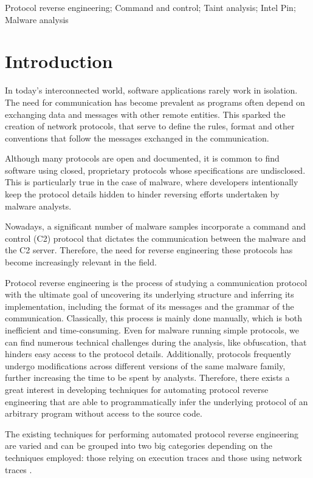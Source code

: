 \documentclass[conference]{IEEEtran}
\begin{document}
\begin{IEEEkeywords}
    Protocol reverse engineering; Command and control; Taint analysis; Intel Pin; Malware analysis 
\end{IEEEkeywords}

\section{Introduction}
In today's interconnected world, software applications rarely work in
isolation. The need for communication has become prevalent as programs often
depend on exchanging data and messages with other remote entities. This sparked
the creation of network protocols, that serve to define the rules, format and
other conventions that follow the messages exchanged in the communication.

Although many protocols are open and documented, it is common to find software
using closed, proprietary protocols whose specifications are undisclosed. This
is particularly true in the case of malware, where developers intentionally
keep the protocol details hidden to hinder reversing efforts undertaken by
malware analysts.

Nowadays, a significant number of malware samples incorporate a command and
control (C2) protocol that dictates the communication between the malware and
the C2 server. Therefore, the need for reverse engineering these protocols has
become increasingly relevant in the field.

Protocol reverse engineering is the process of studying a communication
protocol with the ultimate goal of uncovering its underlying structure and
inferring its implementation, including the format of its messages and the
grammar of the communication. Classically, this process is mainly done
manually, which is both inefficient and time-consuming. Even for malware running
simple protocols, we can find numerous technical challenges during the
analysis, like obfuscation, that hinders easy access to the protocol details.
Additionally, protocols frequently undergo modifications across different
versions of the same malware family, further increasing the time to be spent by
analysts. Therefore, there exists a great interest in developing techniques for
automating protocol reverse engineering that are able to programmatically infer
the underlying protocol of an arbitrary program without access to the source
code.

The existing techniques for performing automated protocol reverse engineering
are varied and can be grouped into two big categories depending on the
techniques employed: those relying on execution traces and those using network
traces \cite{sota_apre}\cite{sota_apre2}.
\end{document}
